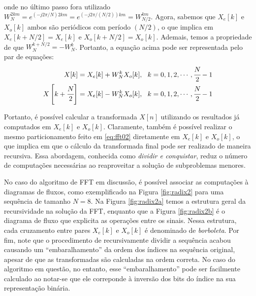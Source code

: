 \documentclass[a4paper,11pt]{article}
\numberwithin{figure}{section}
\numberwithin{equation}{section}
\numberwithin{table}{section}
\theoremstyle{definition}
\begin{document}
\noindent onde no último passo fora utilizado $W_N^{2km} = e^{(-j2\pi / N)2km} = e^{(-j2\pi / (N/2))km} = W_{N/2}^{km}$. Agora, sabemos que $X_e[k]$ e $X_o[k]$ ambos são periódicos com período $(N/2)$, o que implica em $X_e[k+N/2] = X_e[k]$ e $X_o[k+N/2] = X_o[k]$. Ademais, temos a propriedade de que $W_N^{k+N/2} = -W_N^{k}$. Portanto, a equação acima pode ser representada pelo par de equações:
\begin{align} 
	X[k] &= X_e[k] + W_N^k X_o[k],\ \ k = 0,1,2, \cdots, \cfrac{N}{2} - 1 \label{eq:fft03a} \\ 
	X\left[ k + \cfrac{N}{2} \right] &= X_e[k] - W_N^k X_o[k],\ \ k = 0,1,2, \cdots, \cfrac{N}{2} - 1 \label{eq:fft03b}
\end{align} 

Portanto, é possível calcular a transformada $X[n]$ utilizando os resultados já computados em $X_e[k]$ e $X_o[k]$. Claramente, também é possível realizar o mesmo particionamento feito em \eqref{eq:fft02} diretamente em $X_e[k]$ e $X_o[k]$, o que implica em que o cálculo da transformada final pode ser realizado de maneira recursiva. Essa abordagem, conhecida como \textit{dividir e conquistar}, reduz o número de computações necessárias ao reaproveitar a solução de subproblemas menores. 

No caso do algoritmo de FFT em discussão, é possível associar as computações à diagramas de fluxos, como exemplificado na Figura \ref{fig:radix2} para uma sequência de tamanho $N=8$. Na Figura \ref{fig:radix2a} temos a estrutura geral da recursividade na solução da FFT, enquanto que a Figura \ref{fig:radix2b} é o diagrama de fluxo que explicita as operações entre os sinais. Nessa estrutura, cada cruzamento entre pares $X_e[k]$ e $X_o[k]$ é denominado de \textit{borboleta}. Por fim, note que o procedimento de recursivamente dividir a sequência acabou causando um ``embaralhamento'' da ordem dos índices na sequência original, apesar de que as transformadas são calculadas na ordem correta. No caso do algoritmo em questão, no entanto, esse ``embaralhamento'' pode ser facilmente calculado ao notar-se que ele correponde à inversão dos bits do índice na sua representação binária.
\end{document}
